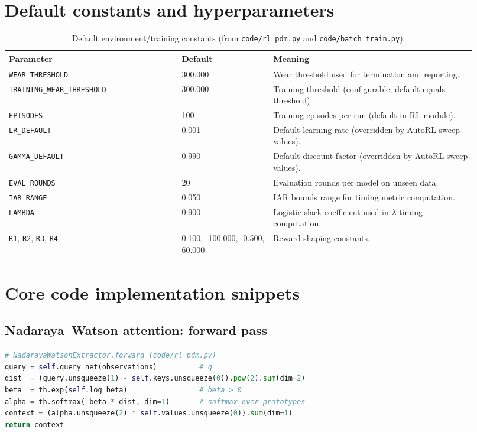 \documentclass[refree,sn-basic]{sn-jnl} %
\begin{document}
\begin{appendices}
\section{Default constants and hyperparameters}
\label{app:defaults}
\begin{table}[t]
\centering
\caption{Default environment/training constants (from \texttt{code/rl\_pdm.py} and \texttt{code/batch\_train.py}).}
\label{tab:defaults}
\begin{tabular}{p{0.34\linewidth} p{0.18\linewidth} p{0.40\linewidth}}
\toprule
\textbf{Parameter} & \textbf{Default} & \textbf{Meaning}\\
\midrule
\texttt{WEAR\_THRESHOLD} & 300.000 & Wear threshold used for termination and reporting.\\
\texttt{TRAINING\_WEAR\_THRESHOLD} & 300.000 & Training threshold (configurable; default equals threshold).\\
\texttt{EPISODES} & 100 & Training episodes per run (default in RL module).\\
\texttt{LR\_DEFAULT} & 0.001 & Default learning rate (overridden by AutoRL sweep values).\\
\texttt{GAMMA\_DEFAULT} & 0.990 & Default discount factor (overridden by AutoRL sweep values).\\
\texttt{EVAL\_ROUNDS} & 20 & Evaluation rounds per model on unseen data.\\
\texttt{IAR\_RANGE} & 0.050 & IAR bounds range for timing metric computation.\\
\texttt{LAMBDA} & 0.900 & Logistic slack coefficient used in $\lambda$ timing computation.\\
\texttt{R1}, \texttt{R2}, \texttt{R3}, \texttt{R4} & 0.100, -100.000, -0.500, 60.000 & Reward shaping constants.\\
\bottomrule
\end{tabular}
\end{table}

\section{Core code implementation snippets}
\label{app:code_snippets}

\subsection{Nadaraya--Watson attention: forward pass}
\begin{lstlisting}[language=Python,caption={NadarayaWatsonExtractor.forward (code/rl\_pdm.py)},label={lst:nw_forward}]
# NadarayaWatsonExtractor.forward (code/rl_pdm.py)
query = self.query_net(observations)          # q
dist  = (query.unsqueeze(1) - self.keys.unsqueeze(0)).pow(2).sum(dim=2)
beta  = th.exp(self.log_beta)                 # beta > 0
alpha = th.softmax(-beta * dist, dim=1)       # softmax over prototypes
context = (alpha.unsqueeze(2) * self.values.unsqueeze(0)).sum(dim=1)
return context
\end{lstlisting}


\end{appendices}
\end{document}
